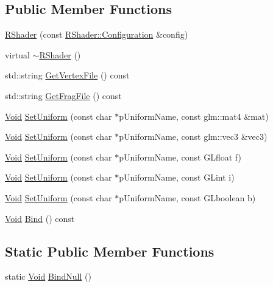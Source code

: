 \subsection*{Public Member Functions}
\begin{DoxyCompactItemize}
\item 
\hyperlink{classgl_1_1_r_shader_a8ed3d356636aa22d0d88679aa1ae1318}{R\-Shader} (const \hyperlink{classgl_1_1_r_shader_1_1_configuration}{R\-Shader\-::\-Configuration} \&config)
\item 
virtual \hyperlink{classgl_1_1_r_shader_ad3263f03a21e05a6f21f748aea8bbea5}{$\sim$\-R\-Shader} ()
\item 
std\-::string \hyperlink{classgl_1_1_r_shader_a058ce8e2bdbe39a1b76d677b188cd26a}{Get\-Vertex\-File} () const 
\item 
std\-::string \hyperlink{classgl_1_1_r_shader_add834ab6c12435ce12e857b31f2fd8b4}{Get\-Frag\-File} () const 
\item 
\hyperlink{_basic_types_8hpp_afdf0f22c576e6ee1b982f64b839c4bea}{Void} \hyperlink{classgl_1_1_r_shader_a339447b0d43a51a40774c9ac66717d20}{Set\-Uniform} (const char $\ast$p\-Uniform\-Name, const glm\-::mat4 \&mat)
\item 
\hyperlink{_basic_types_8hpp_afdf0f22c576e6ee1b982f64b839c4bea}{Void} \hyperlink{classgl_1_1_r_shader_ac8bc1b4975b08ece9a2b9ffc43d8e5f1}{Set\-Uniform} (const char $\ast$p\-Uniform\-Name, const glm\-::vec3 \&vec3)
\item 
\hyperlink{_basic_types_8hpp_afdf0f22c576e6ee1b982f64b839c4bea}{Void} \hyperlink{classgl_1_1_r_shader_a6abdc89ac6a89c0a78faa43018e3d1ad}{Set\-Uniform} (const char $\ast$p\-Uniform\-Name, const G\-Lfloat f)
\item 
\hyperlink{_basic_types_8hpp_afdf0f22c576e6ee1b982f64b839c4bea}{Void} \hyperlink{classgl_1_1_r_shader_a908a3cbe2bb85bff5e50eff0d0d9670f}{Set\-Uniform} (const char $\ast$p\-Uniform\-Name, const G\-Lint i)
\item 
\hyperlink{_basic_types_8hpp_afdf0f22c576e6ee1b982f64b839c4bea}{Void} \hyperlink{classgl_1_1_r_shader_ab45639a1ede87dfc0f4a8458dd5d00e8}{Set\-Uniform} (const char $\ast$p\-Uniform\-Name, const G\-Lboolean b)
\item 
\hyperlink{_basic_types_8hpp_afdf0f22c576e6ee1b982f64b839c4bea}{Void} \hyperlink{classgl_1_1_r_shader_a1a003461d4856a855a3a07f26daf1cb3}{Bind} () const 
\end{DoxyCompactItemize}
\subsection*{Static Public Member Functions}
\begin{DoxyCompactItemize}
\item 
static \hyperlink{_basic_types_8hpp_afdf0f22c576e6ee1b982f64b839c4bea}{Void} \hyperlink{classgl_1_1_r_shader_a61530fe10eb2f39469a706ca42f07336}{Bind\-Null} ()
\end{DoxyCompactItemize}
